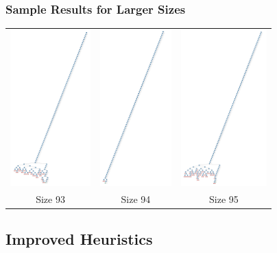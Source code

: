 \begin{frame}
  \frametitle{Sample Results for Larger Sizes}
  \centering
  \begin{tabular}{ccc}
    \includegraphics[height=6cm]{../nqueen/images/gistdomwdegrandom93}
    &
    \includegraphics[height=6cm]{../nqueen/images/gistdomwdegrandom94}
    &
    \includegraphics[height=6cm]{../nqueen/images/gistdomwdegrandom95}\\
    Size 93 & Size 94 & Size 95
    \end{tabular}
\end{frame}

\clearpage
\subsection{Improved Heuristics}

